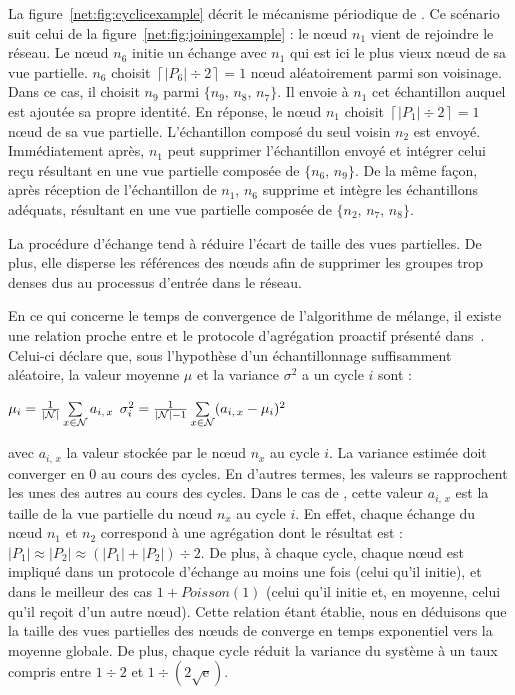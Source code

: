 La figure~\ref{net:fig:cyclicexample} décrit le mécanisme périodique de
\SPRAY. Ce scénario suit celui de la figure~\ref{net:fig:joiningexample} : le
nœud $n_1$ vient de rejoindre le réseau. Le nœud $n_6$ initie un échange avec
$n_1$ qui est ici le plus vieux nœud de sa vue partielle. $n_6$ choisit
$\left\lceil{|P_6|\div 2}\right\rceil = 1$ nœud aléatoirement parmi son
voisinage. Dans ce cas, il choisit $n_9$ parmi $\{n_9,\,n_8,\,n_7\}$. Il envoie
à $n_1$ cet échantillon auquel est ajoutée sa propre identité. En réponse, le
nœud $n_1$ choisit $\left\lceil{|P_1|\div 2}\right\rceil = 1$ nœud de sa vue
partielle. L'échantillon composé du seul voisin $n_2$ est envoyé. Immédiatement
après, $n_1$ peut supprimer l'échantillon envoyé et intégrer celui reçu
résultant en une vue partielle composée de $\{n_6,\, n_9\}$.  De la même façon,
après réception de l'échantillon de $n_1$, $n_6$ supprime et intègre les
échantillons adéquats, résultant en une vue partielle composée de
$\{n_2,\,n_7,\,n_8\}$.

La procédure d'échange tend à réduire l'écart de taille des vues partielles. De
plus, elle disperse les références des nœuds afin de supprimer les groupes trop
denses dus au processus d'entrée dans le réseau.

En ce qui concerne le temps de convergence de l'algorithme de mélange, il existe
une relation proche entre \SPRAY et le protocole d'agrégation proactif
présenté dans~\cite{jelasity2004epidemic, montresor2004robust}. Celui-ci déclare
que, sous l'hypothèse d'un échantillonnage suffisamment aléatoire, la valeur
moyenne $\mu$ et la variance $\sigma^2$ a un cycle $i$ sont :
\begin{center}
  $\mu_i = {1\over{|\mathcal{N}|}} \sum\limits_{x \in \mathcal{N}} a_{i,\,x}$
  \hfill
  $\sigma^2_i = {1\over{|\mathcal{N}|-1}}\sum\limits_{x \in \mathcal{N}}
  (a_{i,\,x} - \mu_i)^2$
\end{center}
avec $a_{i,\,x}$ la valeur stockée par le nœud $n_x$ au cycle $i$. La variance
estimée doit converger en 0 au cours des cycles. En d'autres termes, les valeurs
se rapprochent les unes des autres au cours des cycles. Dans le cas de \SPRAY,
cette valeur $a_{i,\,x}$ est la taille de la vue partielle du nœud $n_x$ au
cycle $i$. En effet, chaque échange du nœud $n_1$ et $n_2$ correspond à une
agrégation dont le résultat est :
$|P_1|\approx|P_2|\approx{(|P_1| + |P_2|) \div 2}$.  De plus, à chaque cycle,
chaque nœud est impliqué dans un protocole d'échange au moins une fois (celui
qu'il initie), et dans le meilleur des cas $1+Poisson(1)$ (celui qu'il initie
et, en moyenne, celui qu'il reçoit d'un autre nœud). Cette relation étant
établie, nous en déduisons que la taille des vues partielles des nœuds de \SPRAY
converge en temps exponentiel vers la moyenne globale. De plus, chaque cycle
réduit la variance du système à un taux compris entre ${1\div 2}$ et
$1\div ({2\sqrt{\text{e}}})$.

